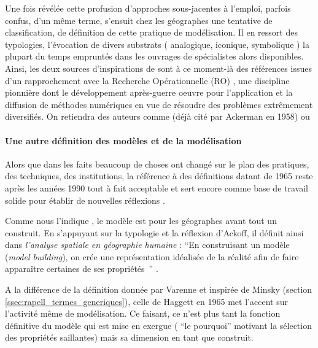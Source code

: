 Une fois révélée cette profusion d'approches sous-jacentes à l'emploi, parfois confus, d'un même terme, s'ensuit chez les géographes une tentative de classification, de définition de cette pratique de modélisation. Il en ressort des typologies, l'évocation de divers substrats ( analogique, iconique, symbolique ) la plupart du temps empruntés dans les ouvrages de spécialistes alors disponibles. Ainsi, les deux sources d'inspirations de \textcites[106]{Berry1963}{Haggett1965} sont à ce moment-là des références issues d'un rapprochement avec la Recherche Opérationnelle (RO) , une discipline pionnière dont le développement après-guerre oeuvre pour l'application et la diffusion de méthodes numériques en vue de résoudre des problèmes extrêmement diversifiés. On retiendra des auteurs comme \textcite{Ackoff1962} (déjà cité par Ackerman en 1958) ou \textcite{Kemeny1962}

\paragraph{Une autre définition des modèles et de la modélisation}
\label{p:autre_def_modele}

Alors que dans les faits beaucoup de choses ont changé sur le plan des pratiques, des techniques, des institutions, la référence à des définitions datant de 1965 reste après les années 1990 tout à fait acceptable \autocites{Dastes2001b, Antony2013}[295]{Bailly1995} et sert encore comme base de travail solide pour établir de nouvelles réflexions \autocite{Brunet2000}.

Comme nous l'indique \textcite{Haggett1965}, le modèle est pour les géographes avant tout un construit. En s'appuyant sur la typologie et la réflexion d'Ackoff, il définit ainsi dans \textit{l'analyse spatiale en géographie humaine} : \enquote{En construisant un modèle (\textit{model building}), on crée une représentation idéalisée de la réalité afin de faire apparaître certaines de ses propriétés } \autocite[30]{Haggett1965}.


A la différence de la définition donnée par Varenne  et inspirée de Minsky (section \ref{ssec:rapell_termes_generiques}), celle de Haggett en 1965 met l'accent sur l'activité même de modélisation. Ce faisant, ce n'est plus tant la fonction définitive du modèle qui est mise en exergue ( \enquote{le pourquoi} motivant la sélection des propriétés saillantes) mais sa dimension en tant que construit.

